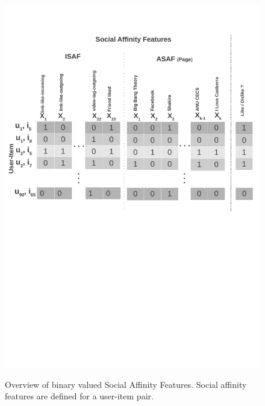 \begin{figure}[t!]
\centering
\includegraphics[width=1\linewidth]{data/plots/features/saf_features}
\label{fig:Features}
\caption{Overview of binary valued Social Affinity Features. Social affinity
 features are defined for a user-item pair.}
\end{figure}

